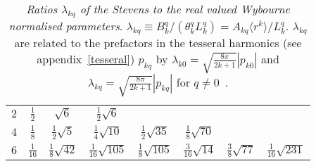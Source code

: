 \begin{table}[h]
\begin{center}
\begin{tabular}{c|ccccccc}
      \hline \hline
      $2$ & $\frac{1}{2}$  & $\sqrt{6}$             & $\frac{1}{2}\sqrt{6}$  & & & & \\
      $4$ & $\frac{1}{8}$  & $\frac{1}{2}\sqrt{5}$  & $\frac{1}{4}\sqrt{10}$   & $\frac{1}{2}\sqrt{35}$ & $\frac{1}{8}\sqrt{70}$   & & \\
      $6$ & $\frac{1}{16}$ & $\frac{1}{8}\sqrt{42}$ & $\frac{1}{16}\sqrt{105}$ & $\frac{1}{8}\sqrt{105}$ & $\frac{3}{16}\sqrt{14}$ &
            $\frac{3}{8}\sqrt{77}$ & $\frac{1}{16}\sqrt{231}$ \\
      \hline
    \end{tabular}
    \caption{\emph{Ratios $\lambda_{kq}$ of the Stevens to the real valued
 Wybourne normalised parameters}.
$\lambda_{kq} \equiv B_k^q/(\theta_k^qL_k^q)= A_{kq}\langle r^k \rangle / L_k^q$. 
$ \lambda_{kq}$ are related to the prefactors in the 
tesseral harmonics (see appendix~\ref{tesseral}) $p_{kq}$ by 
$\lambda_{k0} =\sqrt{\frac{8\pi}{2k+1}}|p_{k0}|$ and
$\lambda_{kq} =\sqrt{\frac{8\pi}{2k+1}}|p_{kq}|$ for $q \neq 0$~\cite[note that Newman on p.30, equ (3.7) defines
his real valued Wybourne 
parameters $B_q^k({\rm Newman})\equiv (-1)^qL_k^q$]{newman00-1}.} \label{tab:wytostev}
  \end{center}
\end{table}
